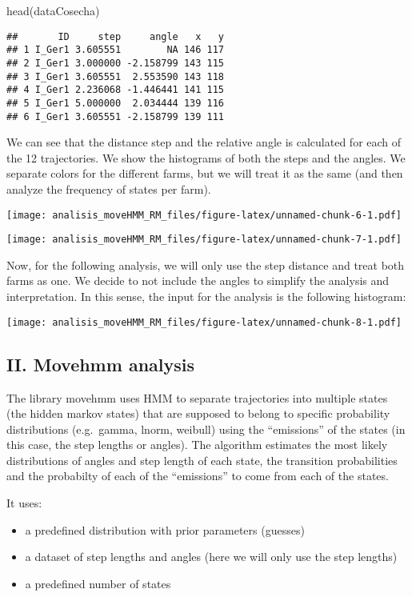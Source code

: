 \documentclass[
]{article}
\newenvironment{Shaded}{\begin{snugshade}}{\end{snugshade}}
\newcommand{\FunctionTok}[1]{\textcolor[rgb]{0.00,0.00,0.00}{#1}}
\newcommand{\NormalTok}[1]{#1}
\providecommand{\tightlist}{%
  \setlength{\itemsep}{0pt}\setlength{\parskip}{0pt}}
\begin{document}
\begin{Shaded}
\begin{Highlighting}[]
\FunctionTok{head}\NormalTok{(dataCosecha)}
\end{Highlighting}
\end{Shaded}

\begin{verbatim}
##       ID     step     angle   x   y
## 1 I_Ger1 3.605551        NA 146 117
## 2 I_Ger1 3.000000 -2.158799 143 115
## 3 I_Ger1 3.605551  2.553590 143 118
## 4 I_Ger1 2.236068 -1.446441 141 115
## 5 I_Ger1 5.000000  2.034444 139 116
## 6 I_Ger1 3.605551 -2.158799 139 111
\end{verbatim}

We can see that the distance step and the relative angle is calculated
for each of the 12 trajectories. We show the histograms of both the
steps and the angles. We separate colors for the different farms, but we
will treat it as the same (and then analyze the frequency of states per
farm).

\texttt{[image: analisis\_moveHMM\_RM\_files/figure-latex/unnamed-chunk-6-1.pdf]}

\texttt{[image: analisis\_moveHMM\_RM\_files/figure-latex/unnamed-chunk-7-1.pdf]}

Now, for the following analysis, we will only use the step distance and
treat both farms as one. We decide to not include the angles to simplify
the analysis and interpretation. In this sense, the input for the
analysis is the following histogram:

\texttt{[image: analisis\_moveHMM\_RM\_files/figure-latex/unnamed-chunk-8-1.pdf]}

\hypertarget{ii.-movehmm-analysis}{%
\subsection{II. Movehmm analysis}\label{ii.-movehmm-analysis}}

The library movehmm uses HMM to separate trajectories into multiple
states (the hidden markov states) that are supposed to belong to
specific probability distributions (e.g.~gamma, lnorm, weibull) using
the ``emissions'' of the states (in this case, the step lengths or
angles). The algorithm estimates the most likely distributions of angles
and step length of each state, the transition probabilities and the
probabilty of each of the ``emissions'' to come from each of the states.

It uses:

\begin{itemize}
\tightlist
\item
  a predefined distribution with prior parameters (guesses)
\item
  a dataset of step lengths and angles (here we will only use the step
  lengths)
\item
  a predefined number of states
\end{itemize}
\end{document}
